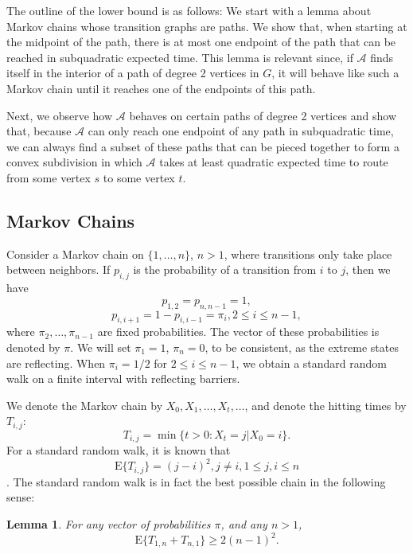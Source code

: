 \documentclass{elsarticle}
\newtheorem{lemma}{Lemma}%
\newcommand{\EXP}{\mathrm{E}}
\begin{document}
The outline of the lower bound is as follows:  We start with a lemma
about Markov chains whose transition graphs are paths. We show that, when
starting at the midpoint of the path, there is at most one endpoint of
the path that can be reached in subquadratic expected time.  This lemma
is relevant since, if $\mathcal{A}$ finds itself in the interior of
a path of degree 2 vertices in $G$, it will behave like such a Markov
chain until it reaches one of the endpoints of this path.

Next, we observe how $\mathcal{A}$ behaves on certain paths of degree 2
vertices and show that, because $\mathcal{A}$ can only reach one endpoint
of any path in subquadratic time, we can always find a subset of
these paths that can be pieced together to form a convex subdivision in
which $\mathcal{A}$ takes at least quadratic expected time to route from
some vertex $s$ to some vertex $t$.

\subsection{Markov Chains}
\label{sec:markov}

Consider a Markov chain on $\{ 1, \ldots, n \}$, $n > 1$, where transitions only
take place between neighbors. If $p_{i,j}$ is the probability of a transition
from $i$ to $j$, then we have 
\[
p_{1,2} = p_{n,n-1} = 1,
\]
\[
p_{i,i+1} = 1-p_{i,i-1} = \pi_i, 2 \le i \le n-1,
\]
where $\pi_2, \ldots, \pi_{n-1}$ are fixed probabilities.
The vector of these probabilities is denoted by $\pi$.
We will set $\pi_1 = 1$, $\pi_n = 0$, to be consistent, as the
extreme states are reflecting.  When $\pi_i = 1/2$ for $2 \le i \le n-1$,
we obtain a standard random walk on a finite interval with reflecting barriers.

We denote the Markov chain by $X_0, X_1, \ldots, X_t , \ldots$,
and denote the hitting times by $T_{i,j}$:
\[
T_{i,j} = \min \{ t > 0: X_t = j | X_0 = i \}.
\]
For a standard random walk, it is known that
\[
\EXP \{ T_{i,j} \} = (j-i)^2, j \not= i, 1 \le j,i \le n
\]
\cite{m73}.  The standard random walk is in fact the best possible chain in the following sense:

\begin{lemma}\label{lemma:backandforth}
For any vector of probabilities $\pi$, and any $n > 1$,
\[
\EXP \{ T_{1,n} + T_{n,1} \} \ge 2 (n-1)^2.
\]
\end{lemma}
\end{document}
